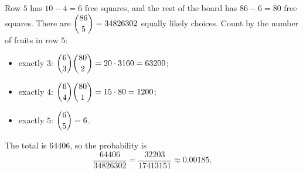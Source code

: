 Row $5$ has $10-4=6$ free squares, and the rest of the board has $86-6=80$ free squares. There are $\dbinom{86}{5}=34826302$ equally likely choices. Count by the number of fruits in row $5$:
\begin{itemize}
\item exactly $3$: $\dbinom63\dbinom{80}{2}=20\cdot3160=63200$;
\item exactly $4$: $\dbinom64\dbinom{80}{1}=15\cdot80=1200$;
\item exactly $5$: $\dbinom65=6$.
\end{itemize}
The total is $64406$, so the probability is
\[\dfrac{64406}{34826302}=\boxed{\dfrac{32203}{17413151}}\approx0.00185.\]

